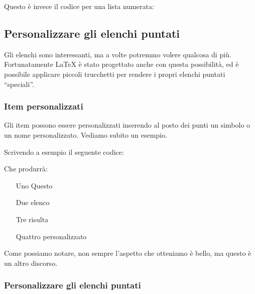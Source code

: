 \vspace{\abovedisplayskip}
\begin{minipage}{\linewidth}
  \noindent Questo è invece il codice per una lista numerata:
  
\end{minipage}
\vspace{\belowdisplayskip}


\subsection{Personalizzare gli elenchi puntati}

Gli elenchi sono interessanti, ma a volte potremmo volere qualcosa di più.
Fortunatamente \LaTeX{} è stato progettato anche con questa possibilità, ed è
possibile applicare piccoli trucchetti per rendere i propri elenchi puntati
``speciali''.

\subsubsection{Item personalizzati}

Gli item possono essere personalizzati inserendo al posto dei punti un simbolo
o un nome personalizzato. Vediamo subito un esempio.

Scrivendo a esempio il seguente codice:



\vspace{\abovedisplayskip}
\begin{minipage}{\linewidth}
  Che produrrà:

  \begin{itemize}
    \item[Uno] Questo
    \item[Due] elenco
    \item[Tre] risulta
    \item[Quattro] personalizzato
  \end{itemize}

\end{minipage}
\vspace{\belowdisplayskip}


\noindent Come possiamo notare, non sempre l'aspetto che otteniamo è bello, ma
questo è un altro discorso.

\subsubsection{Personalizzare gli elenchi puntati}

